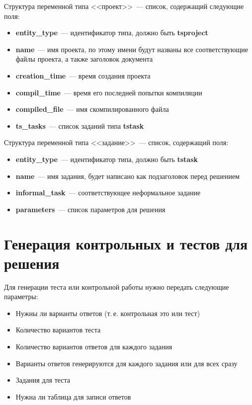 \documentclass[12pt,a4paper]{article}
\begin{document}
Структура переменной типа <<проект>>~--- список, содержащий следующие поля:
\begin{itemize}
\item \textbf{entity\_type}~--- идентификатор типа, должно быть \textbf{tsproject}
\item \textbf{name}~--- имя проекта, по этому имени будут названы все соответствующие файлы проекта, а также заголовок документа
\item \textbf{creation\_time}~--- время создания проекта
\item \textbf{compil\_time}~--- время его последней попытки компиляции
\item \textbf{compiled\_file}~--- имя скомпилированного файла
\item \textbf{ts\_tasks}~--- список заданий типа \textbf{tstask}
\end{itemize}

Структура переменной типа <<задание>>~--- список, содержащий поля:
\begin{itemize}
\item \textbf{entity\_type}~--- идентификатор типа, должно быть \textbf{tstask}
\item \textbf{name}~--- имя задания, будет написано как подзаголовок перед решением
\item \textbf{informal\_task}~--- соответствующее неформальное задание
\item \textbf{parameters}~--- список параметров для решения
\end{itemize}

\section{Генерация контрольных и тестов для решения}

Для генерации теста или контрольной работы нужно передать следующие параметры:
\begin{itemize}
\item Нужны ли варианты ответов (т.\,е. контрольная это или тест)
\item Количество вариантов теста
\item Количество вариантов ответов для каждого задания
\item Варианты ответов генерируются для каждого задания или для всех сразу
\item Задания для теста
\item Нужна ли таблица для записи ответов
\end{itemize}
\end{document}
